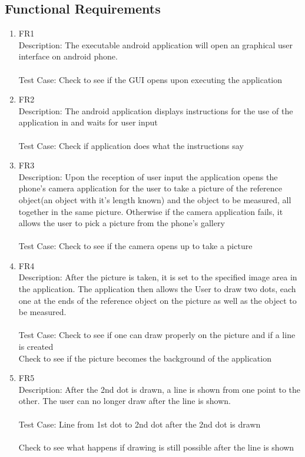 \documentclass[12pt, titlepage]{article}
\begin{document}
\subsection{Functional Requirements}
\begin{enumerate}{}{}
\item FR1 \\Description: The executable android application will open an graphical user interface on android phone. \\ \\
 Test Case: Check to see if the GUI opens upon executing the application 

\item FR2 \\Description: The android application displays instructions for the use of the application in and waits for user input \\ \\
 Test Case: Check if application does what the instructions say

\item FR3 \\Description: Upon the reception of user input the application opens the phone’s camera application for the user to take a picture of the reference object(an object with it’s length known) and the object to be measured, all together in the same picture. Otherwise if the camera application fails, it allows the user to pick a picture from the phone's gallery \\ \\
 Test Case: Check to see if the camera opens up to take a picture

\item FR4 \\Description: After the picture is taken, it is set to the specified image area in the application.  The application then allows the User to draw  two dots, each one at the ends of the reference object on the picture as well as the object to be measured. \\\\
 Test Case: Check to see if one can draw properly on the picture and if a line is created\\ 
  Check to see if the picture becomes the background of the application

\item FR5\\Description: After the 2nd dot is drawn, a line is shown from one point to the other. The user can no longer draw after the line is shown. \\ \\
 Test Case: Line from 1st dot to 2nd dot after the 2nd dot is drawn \\ \\
  Check to see what happens if drawing is still possible after the line is shown


\end{enumerate}
\end{document}
